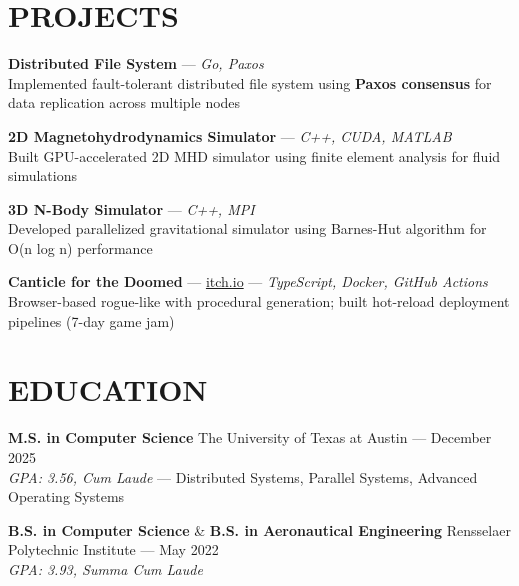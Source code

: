 \documentclass{article}
\begin{document}
\section*{PROJECTS}
\textbf{Distributed File System} — \textit{Go, Paxos} \\
Implemented fault-tolerant distributed file system using \textbf{Paxos consensus} for data replication across multiple nodes

\textbf{2D Magnetohydrodynamics Simulator} — \textit{C++, CUDA, MATLAB} \\
Built GPU-accelerated 2D MHD simulator using finite element analysis for fluid simulations

\textbf{3D N-Body Simulator} — \textit{C++, MPI} \\
Developed parallelized gravitational simulator using Barnes-Hut algorithm for O(n log n) performance

\textbf{Canticle for the Doomed} — \href{https://sve009.itch.io/canticle-for-the-doomed}{itch.io} — \textit{TypeScript, Docker, GitHub Actions} \\
Browser-based rogue-like with procedural generation; built hot-reload deployment pipelines (7-day game jam)

\section*{EDUCATION}
\textbf{M.S. in Computer Science} \hfill The University of Texas at Austin — December 2025 \\
\textit{GPA: 3.56, Cum Laude} — Distributed Systems, Parallel Systems, Advanced Operating Systems

\textbf{B.S. in Computer Science} \& \textbf{B.S. in Aeronautical Engineering} \hfill Rensselaer Polytechnic Institute — May 2022 \\
\textit{GPA: 3.93, Summa Cum Laude}
\end{document}
